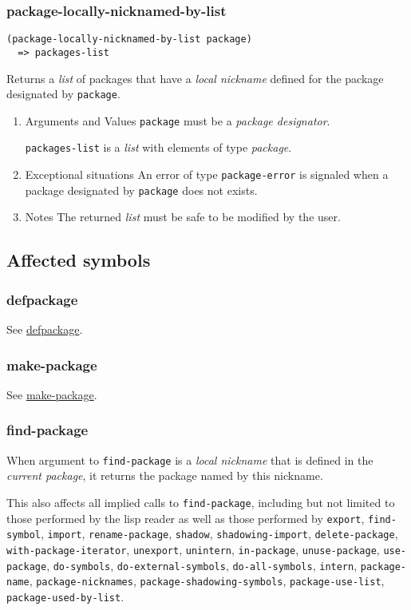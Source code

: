 \documentclass[11pt]{article}
\begin{document}
\subsubsection{package-locally-nicknamed-by-list}
\label{sec:orgeb295dc}
\begin{verbatim}
(package-locally-nicknamed-by-list package)
  => packages-list
\end{verbatim}

Returns a \emph{list} of packages that have a \emph{local nickname} defined for the package
designated by \texttt{package}.
\begin{enumerate}
\item Arguments and Values
\label{sec:org258fbc4}
\texttt{package} must be a \emph{package designator}.

\texttt{packages-list} is a \emph{list} with elements of type \emph{package}.
\item Exceptional situations
\label{sec:org007a0b8}
An error of type \texttt{package-error} is signaled when a package designated by
\texttt{package} does not exists.
\item Notes
\label{sec:orga88e0bc}
The returned \emph{list} must be safe to be modified by the user.
\end{enumerate}
\subsection{Affected symbols}
\label{sec:orged132ef}
\subsubsection{defpackage}
\label{sec:orgd3f5e25}
See \hyperref[sec:org986ea92]{defpackage}.
\subsubsection{make-package}
\label{sec:org8b7de5c}
See \hyperref[sec:org21b99a6]{make-package}.
\subsubsection{find-package}
\label{sec:org3e8fa96}
When argument to \texttt{find-package} is a \emph{local nickname} that is defined in the
\emph{current package}, it returns the package named by this nickname.

This also affects all implied calls to \texttt{find-package}, including but not limited
to those performed by the lisp reader as well as those performed by \texttt{export},
\texttt{find-symbol}, \texttt{import}, \texttt{rename-package}, \texttt{shadow}, \texttt{shadowing-import},
\texttt{delete-package}, \texttt{with-package-iterator}, \texttt{unexport}, \texttt{unintern}, \texttt{in-package},
\texttt{unuse-package}, \texttt{use-package}, \texttt{do-symbols}, \texttt{do-external-symbols},
\texttt{do-all-symbols}, \texttt{intern}, \texttt{package-name}, \texttt{package-nicknames},
\texttt{package-shadowing-symbols}, \texttt{package-use-list}, \texttt{package-used-by-list}.
\end{document}
